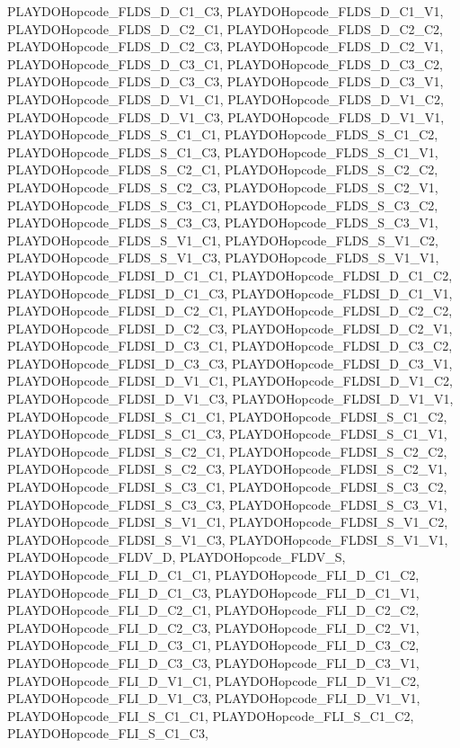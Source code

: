 PLAYDOHopcode\_\-FLDS\_\-D\_\-C1\_\-C3, PLAYDOHopcode\_\-FLDS\_\-D\_\-C1\_\-V1, PLAYDOHopcode\_\-FLDS\_\-D\_\-C2\_\-C1, PLAYDOHopcode\_\-FLDS\_\-D\_\-C2\_\-C2, PLAYDOHopcode\_\-FLDS\_\-D\_\-C2\_\-C3, PLAYDOHopcode\_\-FLDS\_\-D\_\-C2\_\-V1, PLAYDOHopcode\_\-FLDS\_\-D\_\-C3\_\-C1, PLAYDOHopcode\_\-FLDS\_\-D\_\-C3\_\-C2, PLAYDOHopcode\_\-FLDS\_\-D\_\-C3\_\-C3, PLAYDOHopcode\_\-FLDS\_\-D\_\-C3\_\-V1, PLAYDOHopcode\_\-FLDS\_\-D\_\-V1\_\-C1, PLAYDOHopcode\_\-FLDS\_\-D\_\-V1\_\-C2, PLAYDOHopcode\_\-FLDS\_\-D\_\-V1\_\-C3, PLAYDOHopcode\_\-FLDS\_\-D\_\-V1\_\-V1, PLAYDOHopcode\_\-FLDS\_\-S\_\-C1\_\-C1, PLAYDOHopcode\_\-FLDS\_\-S\_\-C1\_\-C2, PLAYDOHopcode\_\-FLDS\_\-S\_\-C1\_\-C3, PLAYDOHopcode\_\-FLDS\_\-S\_\-C1\_\-V1, PLAYDOHopcode\_\-FLDS\_\-S\_\-C2\_\-C1, PLAYDOHopcode\_\-FLDS\_\-S\_\-C2\_\-C2, PLAYDOHopcode\_\-FLDS\_\-S\_\-C2\_\-C3, PLAYDOHopcode\_\-FLDS\_\-S\_\-C2\_\-V1, PLAYDOHopcode\_\-FLDS\_\-S\_\-C3\_\-C1, PLAYDOHopcode\_\-FLDS\_\-S\_\-C3\_\-C2, PLAYDOHopcode\_\-FLDS\_\-S\_\-C3\_\-C3, PLAYDOHopcode\_\-FLDS\_\-S\_\-C3\_\-V1, PLAYDOHopcode\_\-FLDS\_\-S\_\-V1\_\-C1, PLAYDOHopcode\_\-FLDS\_\-S\_\-V1\_\-C2, PLAYDOHopcode\_\-FLDS\_\-S\_\-V1\_\-C3, PLAYDOHopcode\_\-FLDS\_\-S\_\-V1\_\-V1, PLAYDOHopcode\_\-FLDSI\_\-D\_\-C1\_\-C1, PLAYDOHopcode\_\-FLDSI\_\-D\_\-C1\_\-C2, PLAYDOHopcode\_\-FLDSI\_\-D\_\-C1\_\-C3, PLAYDOHopcode\_\-FLDSI\_\-D\_\-C1\_\-V1, PLAYDOHopcode\_\-FLDSI\_\-D\_\-C2\_\-C1, PLAYDOHopcode\_\-FLDSI\_\-D\_\-C2\_\-C2, PLAYDOHopcode\_\-FLDSI\_\-D\_\-C2\_\-C3, PLAYDOHopcode\_\-FLDSI\_\-D\_\-C2\_\-V1, PLAYDOHopcode\_\-FLDSI\_\-D\_\-C3\_\-C1, PLAYDOHopcode\_\-FLDSI\_\-D\_\-C3\_\-C2, PLAYDOHopcode\_\-FLDSI\_\-D\_\-C3\_\-C3, PLAYDOHopcode\_\-FLDSI\_\-D\_\-C3\_\-V1, PLAYDOHopcode\_\-FLDSI\_\-D\_\-V1\_\-C1, PLAYDOHopcode\_\-FLDSI\_\-D\_\-V1\_\-C2, PLAYDOHopcode\_\-FLDSI\_\-D\_\-V1\_\-C3, PLAYDOHopcode\_\-FLDSI\_\-D\_\-V1\_\-V1, PLAYDOHopcode\_\-FLDSI\_\-S\_\-C1\_\-C1, PLAYDOHopcode\_\-FLDSI\_\-S\_\-C1\_\-C2, PLAYDOHopcode\_\-FLDSI\_\-S\_\-C1\_\-C3, PLAYDOHopcode\_\-FLDSI\_\-S\_\-C1\_\-V1, PLAYDOHopcode\_\-FLDSI\_\-S\_\-C2\_\-C1, PLAYDOHopcode\_\-FLDSI\_\-S\_\-C2\_\-C2, PLAYDOHopcode\_\-FLDSI\_\-S\_\-C2\_\-C3, PLAYDOHopcode\_\-FLDSI\_\-S\_\-C2\_\-V1, PLAYDOHopcode\_\-FLDSI\_\-S\_\-C3\_\-C1, PLAYDOHopcode\_\-FLDSI\_\-S\_\-C3\_\-C2, PLAYDOHopcode\_\-FLDSI\_\-S\_\-C3\_\-C3, PLAYDOHopcode\_\-FLDSI\_\-S\_\-C3\_\-V1, PLAYDOHopcode\_\-FLDSI\_\-S\_\-V1\_\-C1, PLAYDOHopcode\_\-FLDSI\_\-S\_\-V1\_\-C2, PLAYDOHopcode\_\-FLDSI\_\-S\_\-V1\_\-C3, PLAYDOHopcode\_\-FLDSI\_\-S\_\-V1\_\-V1, PLAYDOHopcode\_\-FLDV\_\-D, PLAYDOHopcode\_\-FLDV\_\-S, PLAYDOHopcode\_\-FLI\_\-D\_\-C1\_\-C1, PLAYDOHopcode\_\-FLI\_\-D\_\-C1\_\-C2, PLAYDOHopcode\_\-FLI\_\-D\_\-C1\_\-C3, PLAYDOHopcode\_\-FLI\_\-D\_\-C1\_\-V1, PLAYDOHopcode\_\-FLI\_\-D\_\-C2\_\-C1, PLAYDOHopcode\_\-FLI\_\-D\_\-C2\_\-C2, PLAYDOHopcode\_\-FLI\_\-D\_\-C2\_\-C3, PLAYDOHopcode\_\-FLI\_\-D\_\-C2\_\-V1, PLAYDOHopcode\_\-FLI\_\-D\_\-C3\_\-C1, PLAYDOHopcode\_\-FLI\_\-D\_\-C3\_\-C2, PLAYDOHopcode\_\-FLI\_\-D\_\-C3\_\-C3, PLAYDOHopcode\_\-FLI\_\-D\_\-C3\_\-V1, PLAYDOHopcode\_\-FLI\_\-D\_\-V1\_\-C1, PLAYDOHopcode\_\-FLI\_\-D\_\-V1\_\-C2, PLAYDOHopcode\_\-FLI\_\-D\_\-V1\_\-C3, PLAYDOHopcode\_\-FLI\_\-D\_\-V1\_\-V1, PLAYDOHopcode\_\-FLI\_\-S\_\-C1\_\-C1, PLAYDOHopcode\_\-FLI\_\-S\_\-C1\_\-C2, PLAYDOHopcode\_\-FLI\_\-S\_\-C1\_\-C3, 